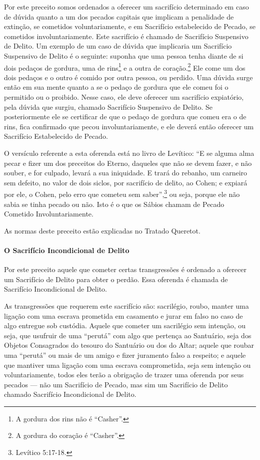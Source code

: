 Por este preceito somos ordenados a oferecer um sacrifício determinado
em caso de dúvida quanto a um dos pecados capitais que implicam a
penalidade de extinção, se cometidos voluntariamente, e em Sacrifício
estabelecido de Pecado, se cometidos involuntariamente. Este sacrifício
é chamado
de Sacrifício Suspensivo de Delito. Um exemplo de um caso de dúvida que
implicaria um Sacrifício Suspensivo de Delito é o seguinte: suponha que
uma
pessoa tenha diante de si dois pedaços de gordura, uma de rins\footnote{A gordura dos rins não é ``Casher''.}
e a outra de coração.\footnote{A gordura do coração é ``Casher''.} Ele come um dos dois pedaços
e o outro é comido por outra pessoa, ou perdido. Uma dúvida surge então
em sua mente quanto a se o pedaço de gordura que ele comeu foi o
permitido ou o proibido. Nesse caso, ele deve oferecer um sacrifício
expiatório, pela dúvida que surgiu, chamado Sacrifício Suspensivo de
Delito. Se posteriormente ele se certificar de que o pedaço de gordura
que comeu era o de rins, fica confirmado que pecou involuntariamente, e
ele deverá então oferecer um Sacrifício Estabelecido de Pecado.

O versículo referente a esta oferenda está no livro de Levítico: ``E se
alguma alma pecar e fizer um dos preceitos do Eterno, daqueles que não
se devem fazer, e não souber, e for culpado, levará a sua iniquidade. E
trará do rebanho, um carneiro sem defeito, no valor de dois siclos, por
sacrifício de delito, ao Cohen; e expiará por ele, o Cohen, pelo
erro que cometeu sem saber'',\footnote{Levítico 5:17-18.} ou seja, porque ele
não sabia se tinha pecado ou não. Isto é o que os Sábios chamam de
Pecado Cometido Involuntariamente.

As normas deste preceito estão explicadas no Tratado Queretot.

\paragraph{O Sacrifício Incondicional de Delito}

Por este preceito aquele que cometer certas transgressões é ordenado a
oferecer um Sacrifício de Delito para obter o perdão. Essa oferenda é
chamada de Sacrifício Incondicional de Delito.

As transgressões que requerem este sacrifício são: sacrilégio, roubo,
manter uma ligação com uma escrava prometida em casamento e jurar em
falso no caso de algo entregue sob custódia. Aquele que cometer um
sacrilégio sem intenção, ou seja, que usufruir de uma ``perutá'' com
algo que pertença ao Santuário, seja dos Objetos Consagrados do tesouro
do Santuário ou dos do Altar; aquele que roubar uma ``perutá'' ou mais
de um amigo e fizer juramento falso a respeito; e aquele que mantiver
uma ligação com uma escrava comprometida, seja sem intenção ou
voluntariamente, todos eles terão a obrigação de trazer uma oferenda por seus pecados --- não um Sacrifício de Pecado, mas
sim um Sacrifício de Delito chamado Sacrifício Incondicional de Delito.

